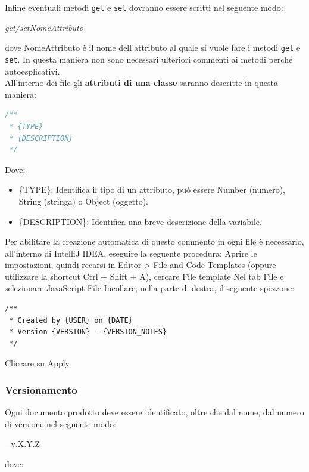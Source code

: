 Infine eventuali metodi \texttt{get} e \texttt{set} dovranno essere scritti nel seguente modo:
\begin{center}
\textit{get/setNomeAttributo}
\end{center}
dove NomeAttributo è il nome dell'attributo al quale si vuole fare i metodi \texttt{get} e \texttt{set}. In questa maniera non sono necessari ulteriori commenti ai metodi perché autoesplicativi.
\\



All'interno dei file gli \textbf{attributi di una classe} saranno descritte in questa maniera:

\begin{lstlisting}[language=JavaScript]
/**
 * {TYPE}
 * {DESCRIPTION}
 */ 
\end{lstlisting}

Dove:
\begin{itemize}
\item \{TYPE\}: Identifica il tipo di un attributo, può essere Number (numero), String (stringa) o Object (oggetto).
\item \{DESCRIPTION\}: Identifica una breve descrizione della variabile.
\end{itemize}


Per abilitare la creazione automatica di questo commento in ogni file è necessario, all'interno di IntelliJ IDEA, eseguire la seguente procedura:
Aprire le impostazioni, quindi recarsi in Editor > File and Code Templates (oppure  utilizzare la shortcut Ctrl + Shift + A), cercare File template
Nel tab File e selezionare JavaScript File
Incollare, nella parte di destra, il seguente spezzone:
\begin{lstlisting}
/**
 * Created by {USER} on {DATE}
 * Version {VERSION} - {VERSION_NOTES}
 */
\end{lstlisting}
Cliccare su Apply.

\subsubsection{Versionamento}
Ogni documento prodotto deve essere identificato, oltre che dal nome, dal numero
di versione nel seguente modo:
\begin{center}
  \_v.X.Y.Z
\end{center}
dove:

